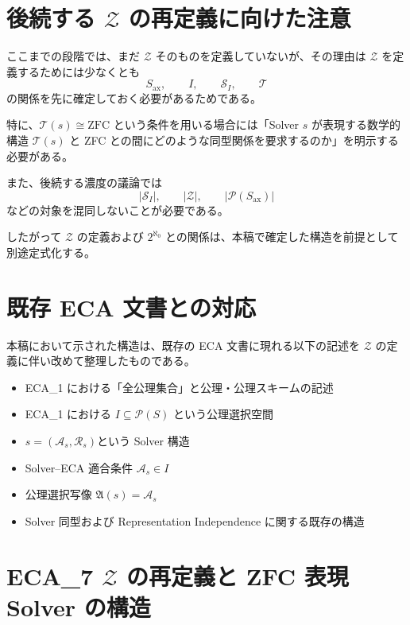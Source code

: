 \documentclass[a4paper,11pt]{article}
\newcommand{\Solver}{\mathcal{S}}
\newcommand{\Ax}{S_{\mathrm{ax}}}
\newcommand{\Sel}{I}
\begin{document}
\section{後続する $\mathcal{Z}$ の再定義に向けた注意}

ここまでの段階では、まだ $\mathcal{Z}$ そのものを定義していないが、その理由は $\mathcal{Z}$ を定義するためには少なくとも
\[
\Ax,\qquad
\Sel,\qquad
\Solver_{\Sel},\qquad
\mathcal{T}
\]
の関係を先に確定しておく必要があるためである。

特に、$\mathcal{T}(s)\cong\mathrm{ZFC}$ という条件を用いる場合には「Solver $s$ が表現する数学的構造 $\mathcal{T}(s)$ と ZFC との間にどのような同型関係を要求するのか」を明示する必要がある。

また、後続する濃度の議論では
\[
|\Solver_{\Sel}|,
\qquad
|\mathcal{Z}|,
\qquad
|\mathcal{P}(\Ax)|
\]
などの対象を混同しないことが必要である。

したがって $\mathcal{Z}$ の定義および $2^{\aleph_0}$ との関係は、本稿で確定した構造を前提として別途定式化する。

\section*{既存 ECA 文書との対応}
本稿において示された構造は、既存の ECA 文書に現れる以下の記述を $\mathcal{Z}$ の定義に伴い改めて整理したものである。

\begin{itemize}
\item ECA_1 における「全公理集合」と公理・公理スキームの記述
\item ECA_1 における $I\subseteq\mathcal{P}(S)$ という公理選択空間
\item $s=(\mathcal{A}_s,\mathcal{R}_s)$という Solver 構造
\item Solver--ECA 適合条件 $\mathcal{A}_s\in I$
\item 公理選択写像 $\mathfrak{A}(s)=\mathcal{A}_s$
\item Solver 同型および Representation Independence に関する既存の構造
\end{itemize}


\section{ECA_7 $\mathcal{Z}$ の再定義と ZFC 表現 Solver の構造}

\begin{abstract}
前章において整理された公理候補全体 $\Ax$、公理選択空間 $I$、Solver 集合 $\Solver$、公理選択写像 $\mathfrak{A}$、および数学的構造写像 $\mathcal{T}$ を前提として、ECA における $\mathcal{Z}$ の位置付けを改めて定義する。
ここでの目的は「Solver の同一性」と「Solver 同型」、「数学的構造の同型」と「数学的構造のモデル」を区別し、$\mathcal{Z}$ を「ECA に適合する Solver のうち、それが表現する数学的構造が ZFC と所定の意味で同型となるものを取り出した部分集合として扱う」ために必要な概念を提供することである。

\end{abstract}
\end{document}
